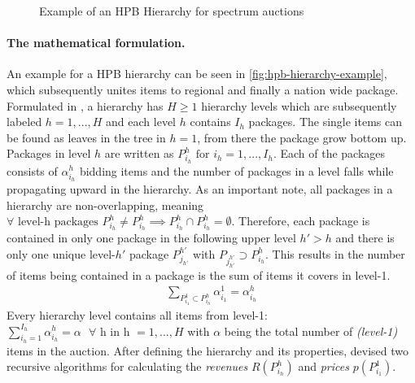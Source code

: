 \begin{figure}[h]
	\centering
	
	\caption{Example of an HPB Hierarchy for spectrum auctions}
	\label{fig:hpb-hierarchy-example}
\end{figure}

\paragraph{The mathematical formulation.}
An example for a HPB hierarchy can be seen in \autoref{fig:hpb-hierarchy-example}, which subsequently unites items to regional and finally a nation wide package. Formulated in \cite{Goeree2010}, a hierarchy has $ H \geq 1 $ hierarchy levels which are subsequently labeled $ h = 1, ..., H $ and each level $h$ contains $ I_h $ packages. The single items can be found as leaves in the tree in $ h = 1 $, from there the package grow bottom up. Packages in level $ h $ are written as $ P_{i_h}^h \text{ for } i_h = 1,..., I_h $. Each of the packages consists of $ \alpha_{i_h}^h $ bidding items and the number of packages in a level falls while propagating upward in the hierarchy. As an important note, all packages in a hierarchy are non-overlapping, meaning $ \forall \text{ level-h packages } P_{i_h}^h \neq P_{i_h}^h \implies P_{i_h}^h \cap P_{i_h}^h = \emptyset $. Therefore, each package is contained in only one package in the following upper level $ h' > h $ and there is only one unique level-$h'$ package $ P_{j_{h'}}^{h'} $ with $ P_{j_{h'}^{h'}} \supset P_{i_h}^h  $. This results in the number of items being contained in a package is the sum of items it covers in level-1.
\begin{align}
	\sum_{P_{i_1}^1 \subset P_{i_h}^h} \alpha_{i_1}^1 = \alpha_{i_h}^h
\end{align}
Every hierarchy level contains all items from level-1: $ \sum_{i_h = 1}^{I_h} \alpha_{i_h}^h = \alpha \text{ } \forall \text{ h in h } = 1,...,H $ with $ \alpha $ being the
 total number of \textit{(level-1)} items in the auction.
After defining the hierarchy and its properties, \citeauthor{Goeree2010} devised two recursive algorithms for calculating the \textit{revenues} $ R(P_{i_h}^h) $ and \textit{prices} $ p(P_{i_1}^1) $.

